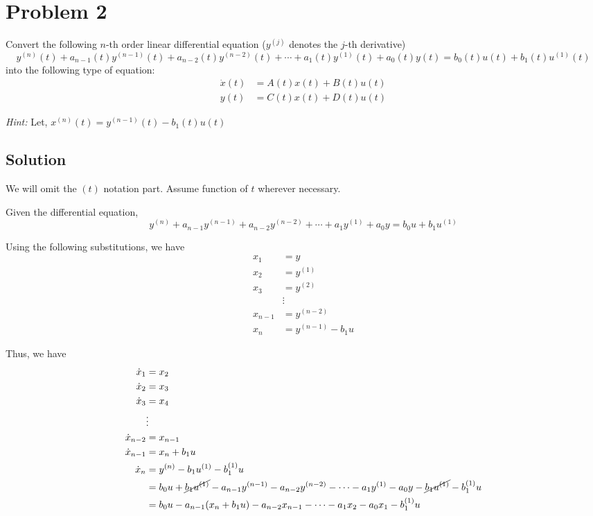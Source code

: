 \section*{Problem 2}

Convert the following \(n\)-th order linear differential equation (\( y^{(j)} \) denotes the \(j\)-th derivative)
\[
    y^{(n)}(t) + a_{n-1}(t) y^{(n-1)}(t) + a_{n-2}(t) y^{(n-2)}(t) + \cdots + a_{1}(t) y^{(1)}(t) + a_{0}(t) y(t) = b_0(t) u(t) + b_1(t) u^{(1)}(t)
\]
into the following type of equation:
\begin{align*}
    \dot{x}(t) & = A(t) x(t) + B(t) u(t) \\
    y(t)       & = C(t) x(t) + D(t) u(t)
\end{align*}

\textit{Hint:} Let, \( x^{(n)}(t) = y^{(n-1)}(t) - b_1(t)u(t) \)

\subsection*{Solution}

We will omit the \((t)\) notation part.
Assume function of \(t\) wherever necessary.

Given the differential equation,
\[
    y^{(n)} + a_{n-1} y^{(n-1)} + a_{n-2} y^{(n-2)} + \cdots + a_1 y^{(1)} + a_0 y = b_0 u + b_1 u^{(1)}
\]

Using the following substitutions, we have
\begin{align*}
    x_1     & = y                 \\
    x_2     & = y^{(1)}           \\
    x_3     & = y^{(2)}           \\
            & \vdots              \\
    x_{n-1} & = y^{(n-2)}         \\
    x_n     & = y^{(n-1)} - b_1 u
\end{align*}

Thus, we have
\begin{align*}
    \dot x_1
     & =
    x_2
    \\
    \dot x_2
     & =
    x_3
    \\
    \dot x_3
     & =
    x_4
    \\
     &
    \vdots
    \\
    \dot x_{n-2}
     & =
    x_{n-1}
    \\
    \dot x_{n-1}
     & =
    x_n + b_1 u
    \\
    \dot x_n
     & =
    y^{(n)} - b_1 u^{(1)} - b_1^{(1)} u
    \\
     & =
    b_0 u + \cancel{b_1 u^{(1)}} - a_{n-1} y^{(n-1)} - a_{n-2} y^{(n-2)} - \cdots - a_1 y^{(1)} - a_0 y - \cancel{b_1 u^{(1)}} - b_1^{(1)} u
    \\
     & =
    b_0 u - a_{n-1} (x_n + b_1 u) - a_{n-2} x_{n-1} - \cdots - a_1 x_2 - a_0 x_1 - b_1^{(1)} u
\end{align*}

